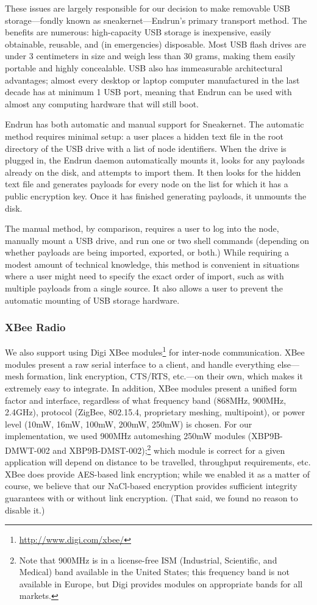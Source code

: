 \documentclass[12pt]{article}
\begin{document}
  These issues are largely responsible for our decision to make removable USB storage---fondly known as sneakernet---Endrun's primary transport method. The benefits are numerous: high-capacity USB storage is inexpensive, easily obtainable, reusable, and (in emergencies) disposable. Most USB flash drives are under 3 centimeters in size and weigh less than 30 grams, making them easily portable and highly concealable. USB also has immeasurable architectural advantages; almost every desktop or laptop computer manufactured in the last decade has at minimum 1 USB port, meaning that Endrun can be used with almost any computing hardware that will still boot.
  
  Endrun has both automatic and manual support for Sneakernet. The automatic method requires minimal setup: a user places a hidden text file in the root directory of the USB drive with a list of node identifiers. When the drive is plugged in, the Endrun daemon automatically mounts it, looks for any payloads already on the disk, and attempts to import them. It then looks for the hidden text file and generates payloads for every node on the list for which it has a public encryption key. Once it has finished generating payloads, it unmounts the disk. 
    
  The manual method, by comparison, requires a user to log into the node, manually mount a USB drive, and run one or two shell commands (depending on whether payloads are being imported, exported, or both.) While requiring a modest amount of technical knowledge, this method is convenient in situations where a user might need to specify the exact order of import, such as with multiple payloads from a single source. It also allows a user to prevent the automatic mounting of USB storage hardware.
  
  \subsubsection{XBee Radio}
  
  We also support using Digi XBee modules\footnote{\url{http://www.digi.com/xbee/}} for inter-node communication. XBee modules present a raw serial interface to a client, and handle everything else---mesh formation, link encryption, CTS/RTS, etc.---on their own, which makes it extremely easy to integrate. In addition, XBee modules present a unified form factor and interface, regardless of what frequency band (868MHz, 900MHz, 2.4GHz), protocol (ZigBee, 802.15.4, proprietary meshing, multipoint), or power level (10mW, 16mW, 100mW, 200mW, 250mW) is chosen. For our implementation, we used 900MHz automeshing 250mW modules (XBP9B-DMWT-002 and XBP9B-DMST-002);\footnote{Note that 900MHz is in a license-free ISM (Industrial, Scientific, and Medical) band available in the United States; this frequency band is not available in Europe, but Digi provides modules on appropriate bands for all markets.} which module is correct for a given application will depend on distance to be travelled, throughput requirements, etc. XBee does provide AES-based link encryption; while we enabled it as a matter of course, we believe that our NaCl-based encryption provides sufficient integrity guarantees with or without link encryption. (That said, we found no reason to disable it.)
  
\end{document}
